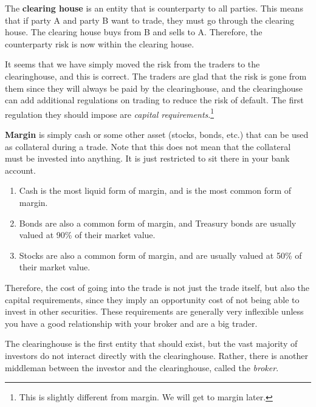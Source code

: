 \documentclass{article}
\begin{document}
    \begin{definition}
      \label{def:clearing-house}
      The \textbf{clearing house} is an entity that is counterparty to all parties. This means that if party A and party B want to trade, they must go through the clearing house. The clearing house buys from B and sells to A. Therefore, the counterparty risk is now within the clearing house.
    \end{definition}

    It seems that we have simply moved the risk from the traders to the clearinghouse, and this is correct. The traders are glad that the risk is gone from them since they will always be paid by the clearinghouse, and the clearinghouse can add additional regulations on trading to reduce the risk of default. The first regulation they should impose are \textit{capital requirements}.\footnote{This is slightly different from margin. We will get to margin later. } 

    \begin{definition}[Margin]
      \label{def:margin}
      \textbf{Margin} is simply cash or some other asset (stocks, bonds, etc.) that can be used as collateral during a trade. Note that this does not mean that the collateral must be invested into anything. It is just restricted to sit there in your bank account. 
      \begin{enumerate}
        \item Cash is the most liquid form of margin, and is the most common form of margin. 
        \item Bonds are also a common form of margin, and Treasury bonds are usually valued at 90\% of their market value.
        \item Stocks are also a common form of margin, and are usually valued at 50\% of their market value. 
      \end{enumerate}
    \end{definition}

    Therefore, the cost of going into the trade is not just the trade itself, but also the capital requirements, since they imply an opportunity cost of not being able to invest in other securities. These requirements are generally very inflexible unless you have a good relationship with your broker and are a big trader. 

    The clearinghouse is the first entity that should exist, but the vast majority of investors do not interact directly with the clearinghouse. Rather, there is another middleman between the investor and the clearinghouse, called the \textit{broker}. 
\end{document}
